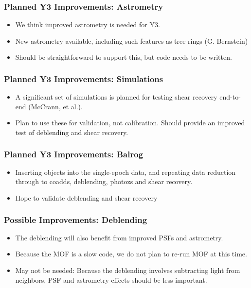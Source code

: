 \documentclass{beamer}
\begin{document}
\frame
{
    \frametitle{Planned Y3 Improvements: Astrometry}

    \begin{itemize}

        \item We think improved astrometry is needed for Y3.
        \item New astrometry available, including such
            features as tree rings (G. Bernstein)
        \item Should be straightforward to support this,
            but code needs to be written.


    \end{itemize}

}

\frame
{
    \frametitle{Planned Y3 Improvements: Simulations}

    \begin{itemize}

        \item A significant set of simulations is planned
            for testing shear recovery end-to-end (McCrann, et al.).

        \item Plan to use these for validation, not calibration.  
            Should provide an improved test of deblending and
            shear recovery.

    \end{itemize}

}

\frame
{
    \frametitle{Planned Y3 Improvements: Balrog}

    \begin{itemize}

        \item Inserting objects into the single-epoch data, and
            repeating data reduction through to coadds, 
            deblending, photozs and shear recovery.

        \item Hope to validate deblending and shear recovery

    \end{itemize}

}


\frame
{
    \frametitle{Possible Improvements: Deblending}

    \begin{itemize}

        \item The deblending will also benefit from improved
            PSFs and astrometry.

        \item Because the MOF is a slow code, we do not plan
            to re-run MOF at this time.

        \item May not be needed: Because the deblending involves
            subtracting light from neighbors, PSF and astrometry
            effects should be less important.


    \end{itemize}

}
\end{document}
